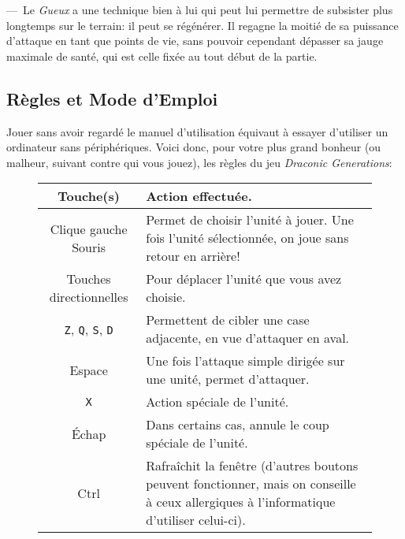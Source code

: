 \documentclass[11pt, a4paper, oneside, portrait]{article}
\begin{document}
            ---~Le \emph{Gueux} a une technique bien à lui qui peut lui permettre de subsister plus longtemps sur le terrain: il peut se régénérer.
            Il regagne la moitié de sa puissance d'attaque en tant que points de vie, sans pouvoir cependant dépasser sa jauge maximale de santé, qui est celle fixée au tout début de la partie.

        \subsection*{Règles et Mode d'Emploi}
            Jouer sans avoir regardé le manuel d'utilisation équivaut à essayer d'utiliser un ordinateur sans périphériques.
            Voici donc, pour votre plus grand bonheur (ou malheur, suivant contre qui vous jouez), les règles du jeu \emph{Draconic Generations}:
            \begin{figure}[H]
                \centering
                \begin{tabularx}{0.75\textwidth}{|c|X|}
                    \hline
                    Touche(s) & Action effectuée.\\
                    \hline
                    Clique gauche Souris & Permet de choisir l'unité à jouer. Une fois l'unité sélectionnée, on joue sans retour en arrière!\\
                    \hline
                    Touches directionnelles & Pour déplacer l'unité que vous avez choisie.\\
                    \hline
                    \texttt{Z}, \texttt{Q}, \texttt{S}, \texttt{D} & Permettent de cibler une case adjacente, en vue d'attaquer en aval.\\
                    \hline
                    Espace & Une fois l'attaque simple dirigée sur une unité, permet d'attaquer.\\
                    \hline
                    \texttt{X} & Action spéciale de l'unité.\\
                    \hline
                    Échap & Dans certains cas, annule le coup spéciale de l'unité.\\
                    \hline
                    Ctrl & Rafraîchit la fenêtre (d'autres boutons peuvent fonctionner, mais on conseille à ceux allergiques à l'informatique d'utiliser celui-ci).\\
                    \hline
                \end{tabularx}
            \end{figure}
\end{document}
